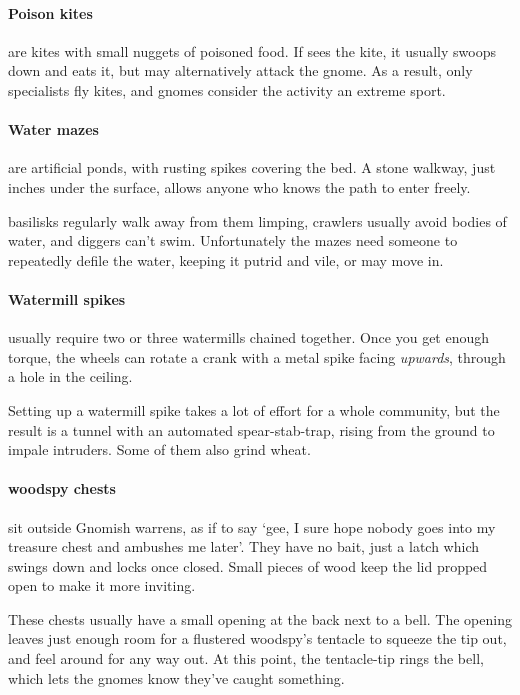 \paragraph{Poison kites}
are kites with small nuggets of poisoned food.
If  sees the kite, it usually swoops down and eats it, but may alternatively attack the gnome.
As a result, only specialists fly kites, and gnomes consider the activity an extreme sport.

\paragraph{Water mazes}
are artificial ponds, with rusting spikes covering the bed.
A stone walkway, just inches under the surface, allows anyone who knows the path to enter freely.

\Glspl{basilisk} regularly walk away from them limping, \glspl{crawler} usually avoid bodies of water, and \glspl{digger} can't swim.
Unfortunately the mazes need someone to repeatedly defile the water, keeping it putrid and vile, or  may move in.

\paragraph{Watermill spikes}
usually require two or three watermills chained together.
Once you get enough torque, the wheels can rotate a crank with a metal spike facing \emph{upwards}, through a hole in the ceiling.

Setting up a watermill spike takes a lot of effort for a whole community, but the result is a tunnel with an automated spear-stab-trap, rising from the ground to impale intruders.
Some of them also grind wheat.

\paragraph{\Gls{woodspy} chests}
sit outside Gnomish warrens, as if to say `gee, I sure hope nobody goes into my treasure chest and ambushes me later'.
They have no bait, just a latch which swings down and locks once closed.
Small pieces of wood keep the lid propped open to make it more inviting.

These chests usually have a small opening at the back next to a bell.
The opening leaves just enough room for a flustered \gls{woodspy}'s  tentacle to squeeze the tip out, and feel around for any way out.
At this point, the tentacle-tip rings the bell, which lets the gnomes know they've caught something.

